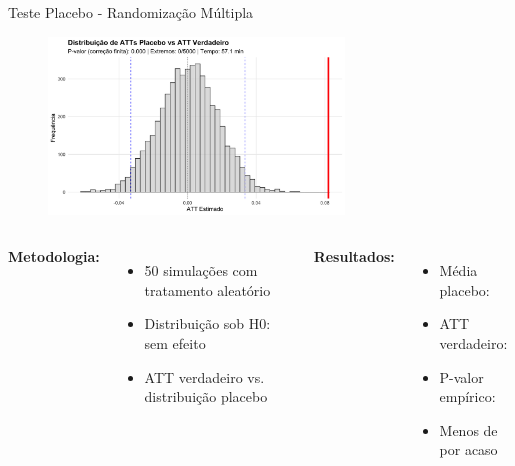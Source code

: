 \documentclass[10pt,aspectratio=169]{beamer}
\begin{document}
\begin{frame}{Teste Placebo - Randomização Múltipla}
\begin{figure}
\centering
\includegraphics[width=0.7\textwidth]{../../../data/outputs/placebo_distribution.png}
\end{figure}

\begin{columns}
\textbf{Metodologia:}
\begin{itemize}
    \item 50 simulações com tratamento aleatório
    \item Distribuição sob H0: sem efeito
    \item ATT verdadeiro vs. distribuição placebo
\end{itemize}

\textbf{Resultados:}
\begin{itemize}
    \item Média placebo: \placebomean{}
    \item ATT verdadeiro: \placebotruatt{}
    \item P-valor empírico: \placebopvalue{}
    \item Menos de \placebopvaluepct{} por acaso
\end{itemize}
\end{columns}
\end{frame}
\end{document}
